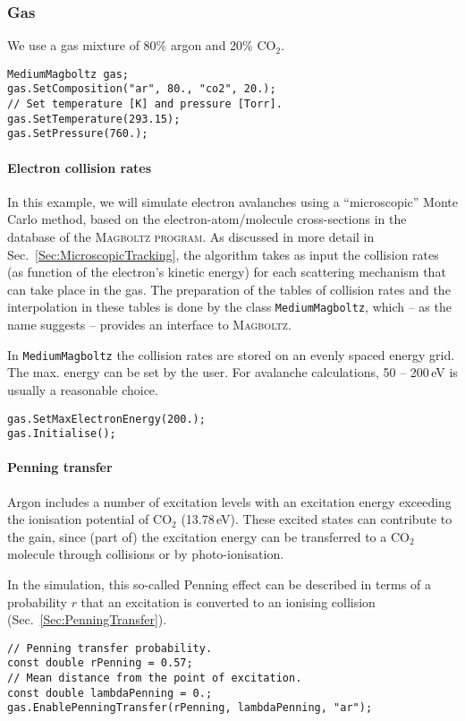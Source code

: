 \subsubsection{Gas}
We use a gas mixture of 80\% argon and 20\% CO\(_{2}\).
\begin{lstlisting}
MediumMagboltz gas;
gas.SetComposition("ar", 80., "co2", 20.);
// Set temperature [K] and pressure [Torr].
gas.SetTemperature(293.15);
gas.SetPressure(760.);
\end{lstlisting}
\paragraph{Electron collision rates}
In this example, we will simulate electron avalanches using 
a ``microscopic'' Monte Carlo method,
based on the electron-atom/molecule cross-sections in the database of the 
\textsc{Magboltz program}. 
As discussed in more detail in Sec.~\ref{Sec:MicroscopicTracking},
the algorithm takes as input the collision rates (as function of the 
electron's kinetic energy) for each scattering mechanism 
that can take place in the gas.
The preparation of the tables of collision rates and the interpolation 
in these tables is done by the class \texttt{MediumMagboltz}, which -- as
the name suggests -- provides an interface to \textsc{Magboltz}.

In \texttt{MediumMagboltz} the collision rates are stored on an
evenly spaced energy grid. The max. energy can be set by the user.
For avalanche calculations, 50 -- 200\,eV is usually a reasonable choice.
\begin{lstlisting}
gas.SetMaxElectronEnergy(200.);
gas.Initialise();
\end{lstlisting}
\paragraph{Penning transfer}
Argon includes a number of excitation levels with an excitation energy
exceeding the ionisation potential of CO$_{2}$ (13.78\,eV).
These excited states can contribute to the gain,
since (part of) the excitation energy can be transferred
to a CO$_2$ molecule through collisions or by photo-ionisation.

In the simulation, this so-called Penning effect can be described 
in terms of a probability $r$ that an excitation is converted to an 
ionising collision (Sec.~\ref{Sec:PenningTransfer}).
\begin{lstlisting}
// Penning transfer probability.
const double rPenning = 0.57;
// Mean distance from the point of excitation.
const double lambdaPenning = 0.;
gas.EnablePenningTransfer(rPenning, lambdaPenning, "ar");
\end{lstlisting}
